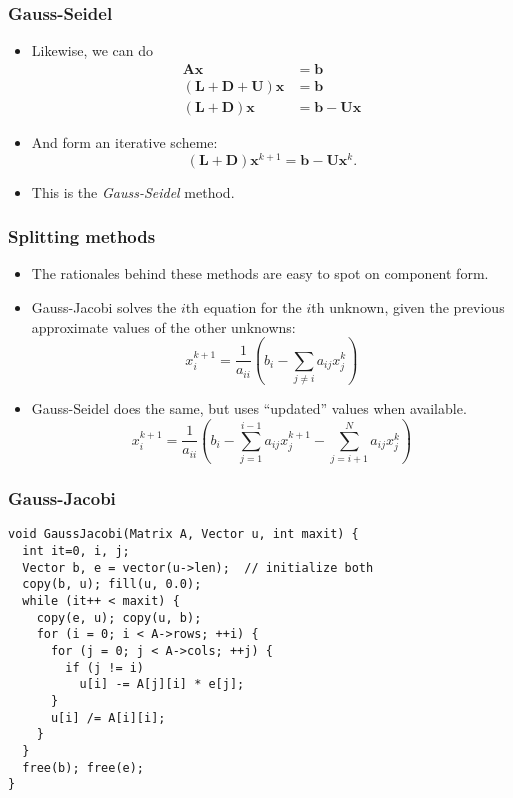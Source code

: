 \begin{frame}
  \frametitle{Gauss-Seidel}
  \begin{itemize}
  \item Likewise, we can do
    \begin{align*}
      \bm A \bm x &= \bm b \\
      (\bm L + \bm D + \bm U) \bm x &= \bm b \\
      (\bm L + \bm D) \bm x &= \bm b - \bm U \bm x
    \end{align*}
  \item And form an iterative scheme:
    \[
      (\bm L + \bm D) \bm x^{k+1} = \bm b - \bm U \bm x^k.
    \]
  \item This is the \emph{Gauss-Seidel} method.
  \end{itemize}
\end{frame}

\begin{frame}
  \frametitle{Splitting methods}
  \begin{itemize}
  \item The rationales behind these methods are easy to spot on component form.
  \item Gauss-Jacobi solves the $i$th equation for the $i$th unknown, given the
    previous approximate values of the other unknowns:
    \[
      x_i^{k+1} = \frac{1}{a_{ii}}\left( b_i - \sum_{j \not= i} a_{ij} x_j^k \right)
    \]
  \item Gauss-Seidel does the same, but uses ``updated'' values when available.
    \[
      x_i^{k+1} = \frac{1}{a_{ii}}
      \left( b_i - \sum_{j=1}^{i-1} a_{ij} x_j^{k+1} - \sum_{j=i+1}^{N} a_{ij} x_j^k \right)
    \]
  \end{itemize}
\end{frame}

\begin{frame}[fragile]
  \frametitle{Gauss-Jacobi}
\begin{lstlisting}[style=c, basicstyle=\ttfamily\scriptsize]
void GaussJacobi(Matrix A, Vector u, int maxit) {
  int it=0, i, j;
  Vector b, e = vector(u->len);  // initialize both
  copy(b, u); fill(u, 0.0);
  while (it++ < maxit) {
    copy(e, u); copy(u, b);
    for (i = 0; i < A->rows; ++i) {
      for (j = 0; j < A->cols; ++j) {
        if (j != i)
          u[i] -= A[j][i] * e[j];
      }
      u[i] /= A[i][i];
    }
  }
  free(b); free(e);
}
\end{lstlisting}
\end{frame}

